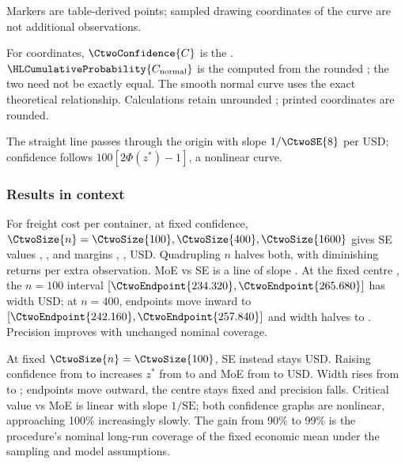 \begin{landscape}
\begin{minipage}{\linewidth}
\begin{minipage}[t]{.43\linewidth}
Markers are table-derived points; sampled drawing coordinates of the curve are not additional observations.

For  coordinates, $\CtwoConfidence{C}$ is the . $\HLCumulativeProbability{C_{\rm normal}}$ is the  computed from the rounded ; the two need not be exactly equal. The smooth normal curve uses the exact theoretical relationship. Calculations retain unrounded ; printed coordinates are rounded.
\end{minipage}
\end{minipage}
\par\medskip

The straight line passes through the origin with slope $1/\CtwoSE{8}$ per USD; confidence follows $100[2\Phi(z^*)-1]$, a nonlinear curve.

\clearpage
\CthreeNormalComparison

\end{landscape}
\clearpage
{}
\subsubsection*{Results in context}
For freight cost per container, at fixed  confidence, $\CtwoSize{n}=\CtwoSize{100},\CtwoSize{400},\CtwoSize{1600}$ gives SE values , ,  and margins , ,  USD. Quadrupling $n$ halves both, with diminishing returns per extra observation. MoE vs SE is a line of slope . At the fixed centre , the $n=100$ interval $[\CtwoEndpoint{234.320},\CtwoEndpoint{265.680}]$ has width  USD; at $n=400$, endpoints move inward to $[\CtwoEndpoint{242.160},\CtwoEndpoint{257.840}]$ and width halves to . Precision improves with unchanged nominal coverage.

At fixed $\CtwoSize{n}=\CtwoSize{100}$, SE instead stays  USD. Raising confidence from  to  increases $z^*$ from  to  and MoE from  to  USD. Width rises from  to ; endpoints move outward, the centre stays fixed and precision falls. Critical value vs MoE is linear with slope $1/\mathrm{SE}$; both confidence graphs are nonlinear, approaching 100\% increasingly slowly. The gain from 90\% to 99\% is the procedure's nominal long-run coverage of the fixed economic mean under the sampling and model assumptions.
\clearpage

